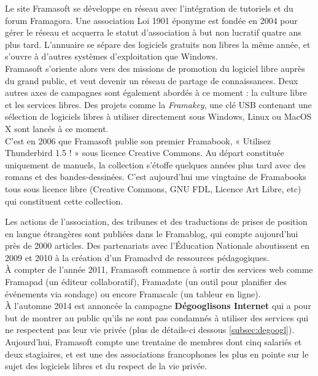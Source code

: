 \documentclass[10pt,a4paper, twoside]{report}
\begin{document}
	Le site Framasoft se développe en réseau avec l'intégration de tutoriels et du forum Framagora. Une association Loi 1901 éponyme est fondée en 2004 pour gérer le réseau et acquerra le statut d'association à but non lucratif quatre ans plus tard. L'annuaire se sépare des logiciels gratuits non libres la même année, et s'ouvre à d'autres systèmes d'exploitation que Windows.
	\\
	
	Framasoft s'oriente alors vers des missions de promotion du logiciel libre auprès du grand public, et veut devenir un réseau de partage de connaissances. Deux autres axes de campagnes sont également abordés à ce moment : la culture libre et les services libres. Des projets comme la \textit{Framakey}, une clé USB contenant une sélection de logiciels libres à utiliser directement sous Windows, Linux ou MacOS X sont lancés à ce moment.
	\\
	
	C'est en 2006 que Framasoft publie son premier Framabook, « Utilisez Thunderbird 1.5 ! » sous licence Creative Commons. Au départ constituée uniquement de manuels, la collection s'étoffe quelques années plus tard avec des romans et des bandes-dessinées. C'est aujourd'hui une vingtaine de Framabooks tous sous licence libre (Creative Commons, GNU FDL, Licence Art Libre, etc) qui constituent cette collection.
	
	Les actions de l'association, des tribunes et des traductions de prises de position en langue étrangères sont publiées dans le Framablog, qui compte aujourd'hui près de 2000 articles. Des partenariats avec l'Éducation Nationale aboutissent en 2009 et 2010 à la création d'un Framadvd de ressources pédagogiques.
	\\
	
	À compter de l'année 2011, Framasoft commence à sortir des services web comme Framapad (un éditeur collaboratif), Framadate (un outil pour planifier des événements via sondage) ou encore Framacalc (un tableur en ligne).
	\\
	
	À l'automne 2014 est annoncée la campagne \textbf{Dégooglisons Internet} qui a pour but de montrer au public qu'ils ne sont pas condamnés à utiliser des services qui ne respectent pas leur vie privée (plus de détails-ci dessous \ref{subsec:degoogl}).
	\\
	
	Aujourd'hui, Framasoft compte une trentaine de membres dont cinq salariés et deux stagiaires, et est une des associations francophones les plus en pointe sur le sujet des logiciels libres et du respect de la vie privée.
	\\
	
\end{document}
